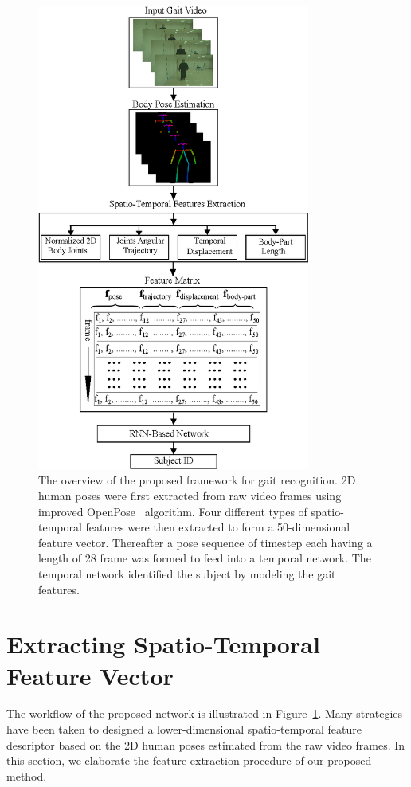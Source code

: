\begin{figure}
	\centering
	\includegraphics[width=0.8\textwidth]{figures/proposed_method.eps}
	\caption [The overview of the proposed framework for gait recognition] 
	{The overview of the proposed framework for gait recognition. 2D human poses were first extracted from raw video frames using improved OpenPose~\cite{Cao_19} algorithm. Four different types of spatio-temporal features were then extracted to form a 50-dimensional feature vector. Thereafter a pose sequence of timestep each having a length of 28 frame was formed to feed into a temporal network. The temporal network identified the subject by modeling the gait features. \label{fig:overview_proposed_method}
	}	
\end{figure}

\section{Extracting Spatio-Temporal Feature Vector}
The workflow of the proposed network is illustrated in Figure~\ref{fig:overview_proposed_method}. Many strategies have been taken to designed a lower-dimensional spatio-temporal feature descriptor based on the 2D human poses estimated from the raw video frames. In this section, we elaborate the feature extraction procedure of our proposed method. 

